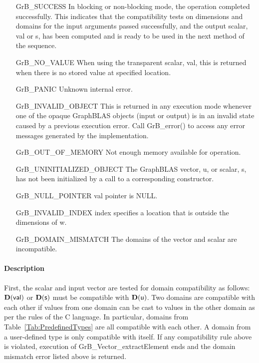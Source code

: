 \begin{itemize}[leftmargin=2.1in]
    \item[{\sf GrB\_SUCCESS}]  In blocking or non-blocking mode, the operation 
    completed successfully. This indicates that the compatibility tests on 
    dimensions and domains for the input arguments passed successfully, and
    the output scalar, {\sf val} or {\sf s}, has been computed and is ready to be used in 
    the next method of the sequence.

    \item[{\sf GrB\_NO\_VALUE}]  When using the transparent scalar, {\sf val}, this is returned when there is no stored value at specified location.
    
    \item[{\sf GrB\_PANIC}]   Unknown internal error.
    
    \item[{\sf GrB\_INVALID\_OBJECT}] This is returned in any execution mode 
    whenever one of the opaque GraphBLAS objects (input or output) is in an invalid 
    state caused by a previous execution error.  Call {\sf GrB\_error()} to access 
    any error messages generated by the implementation.

    \item[{\sf GrB\_OUT\_OF\_MEMORY}]  Not enough memory available for operation.
    
    \item[{\sf GrB\_UNINITIALIZED\_OBJECT}]  The GraphBLAS vector, {\sf u}, or scalar,
    {\sf s}, has not been initialized by a call to a corresponding constructor.
    
    \item[{\sf GrB\_NULL\_POINTER}]    {\sf val} pointer is {\sf NULL}.

    \item[{\sf GrB\_INVALID\_INDEX}]  {\sf index} specifies a location 
    that is outside the dimensions of {\sf w}.

    \item[{\sf GrB\_DOMAIN\_MISMATCH}]     The domains of the vector and scalar
    are incompatible.
\end{itemize}

\paragraph{Description}

First, the scalar and input vector are tested for domain compatibility as follows:
$\mathbf{D}({\sf val})$ or $\mathbf{D}({\sf s})$ must be compatible with $\mathbf{D}({\sf u})$. Two domains 
are compatible with each other if values from one domain can be cast to values 
in the other domain as per the rules of the C language. In particular, domains 
from Table~\ref{Tab:PredefinedTypes} are all compatible with each other. A domain 
from a user-defined type is only compatible with itself. If any compatibility 
rule above is violated, execution of {\sf GrB\_Vector\_extractElement} ends and 
the domain mismatch error listed above is returned.

